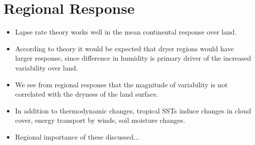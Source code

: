 
\section{Regional Response}

\begin{itemize}
	\item Lapse rate theory works well in the mean continental response over 
		land.
	\item According to theory it would be expected that dryer regions would have 
		larger response, since difference in humidity is primary driver of the 
		increased variability over land.
	\item We see from regional response that the magnitude of variability is not 
		correlated with the dryness of the land surface.
	\item In addition to thermodynamic changes, tropical SSTs induce changes in 
		cloud cover, energy transport by winds, soil moisture changes.
	\item Regional importance of these discussed...
\end{itemize}
